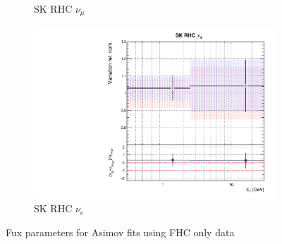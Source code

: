 \begin{figure}[t]
\begin{subfigure}{0.24\textwidth}
  \caption{SK RHC $\nu_{\mu}$}
  \label{fig:}
\end{subfigure}
\begin{subfigure}{0.24\textwidth}
  \centering
  \includegraphics[width=0.95\linewidth]{figs/rhcmpdat248flux_15}
  \caption{SK RHC $\nu_e$}
  \label{fig:}
\end{subfigure}
\caption{Fux parameters for Asimov fits using FHC only data}
\label{fig:rhcmpidat248fluxSK}
\end{figure}

